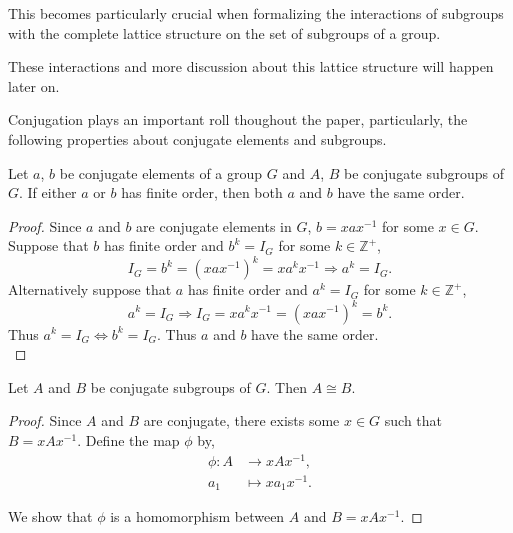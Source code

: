 \begin{remark}
\begin{remark}
This becomes particularly crucial when formalizing the interactions of subgroups with the complete lattice structure on the set of subgroups of a group. 

These interactions and more discussion about this lattice structure will happen later on.
\end{remark}

Conjugation plays an important roll thoughout the paper, particularly, the following properties about conjugate elements and subgroups.

\begin{proposition}
    \label{orderOf_injective}
Let $a$, $b$ be conjugate elements of a group $G$ and $A$, $B$ be conjugate subgroups of $G$.
If either $a$ or $b$ has finite order, then both $a$ and $b$ have the same order.
\end{proposition}

\begin{proof}
    Since $a$ and $b$ are conjugate elements in $G$, $b = xax^{-1}$ for some $x \in G$. Suppose that $b$ has finite order and $b^k = I_G$ for some $k \in \mathbb{Z}^+$,
    \begin{equation*} 
        I_G = b^k = (xax^{-1})^k = xa^{k}x^{-1} \Rightarrow a^k = I_G.
    \end{equation*}
    Alternatively suppose that $a$ has finite order and $a^k = I_G$ for some $k \in \mathbb{Z}^+$,
    \begin{equation*} 
        a^k = I_G \Rightarrow I_G = xa^{k}x^{-1} = (xax^{-1})^k = b^k.
    \end{equation*}
    Thus $a^k = I_G \iff b^k = I_G$. Thus $a$ and $b$ have the same order. \\
\end{proof}

\begin{proposition}
Let $A$ and $B$ be conjugate subgroups of $G$. Then $A \cong B$.
\end{proposition}

\begin{proof}
Since $A$ and $B$ are conjugate, there exists some $x \in G$ such that $B=xAx^{-1}$. Define the map $\phi$ by,
\begin{align*}
\phi:A &\longrightarrow xAx^{-1}, \\
a_1 &\longmapsto xa_1x^{-1} \tag{$\forall \; a_1 \in A$}. 
\end{align*}

We show that $\phi$ is a homomorphism between $A$ and $B=xAx^{-1}$.


\end{proof}
\end{remark}
